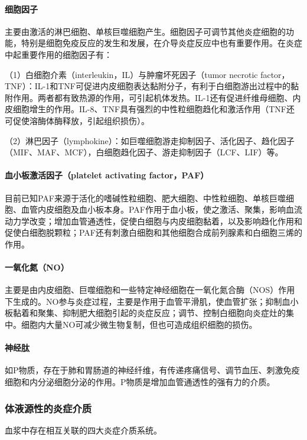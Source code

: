 \paragraph{细胞因子}
主要由激活的淋巴细胞、单核巨噬细胞产生。细胞因子可调节其他炎症细胞的功能，特别是细胞免疫反应的发生和发展，在介导炎症反应中也有重要作用。在炎症中起重要作用的细胞因子有：

（1）白细胞介素（interleukin，IL）与肿瘤坏死因子（tumor necrotic
factor，TNF）：IL-1和TNF可促进内皮细胞表达黏附分子，有利于白细胞游出过程中的黏附作用。两者都有致热源的作用，可引起机体发热。IL-1还有促进纤维母细胞、内皮细胞增生的作用。IL-8、TNF具有强烈的中性粒细胞趋化和激活作用（TNF还可促使溶酶体酶释放，引起组织损伤）。

（2）淋巴因子（lymphokine）：如巨噬细胞游走抑制因子、活化因子、趋化因子（MIF、MAF、MCF），白细胞趋化因子、游走抑制因子（LCF、LIF）等。

\paragraph{血小板激活因子（platelet activating factor，PAF）}
目前已知PAF来源于活化的嗜碱性粒细胞、肥大细胞、中性粒细胞、单核巨噬细胞、血管内皮细胞及血小板本身。PAF作用于血小板，使之激活、聚集，影响血流动力学改变；增加血管通透性，促使白细胞与内皮细胞黏着，以及影响趋化作用和促使白细胞脱颗粒；PAF还有刺激白细胞和其他细胞合成前列腺素和白细胞三烯的作用。

\paragraph{一氧化氮（NO）}
主要是由内皮细胞、巨噬细胞和一些特定神经细胞在一氧化氮合酶（NOS）作用下生成的。NO参与炎症过程，主要是作用于血管平滑肌，使血管扩张；抑制血小板黏着和聚集、抑制肥大细胞引起的炎症反应；调节、控制白细胞向炎症灶的集中。细胞内大量NO可减少微生物复制，但也可造成组织细胞的损伤。

\paragraph{神经肽}
如P物质，存在于肺和胃肠道的神经纤维，有传递疼痛信号、调节血压、刺激免疫细胞和内分泌细胞分泌的作用。P物质是增加血管通透性的强有力的介质。

\subsubsection{体液源性的炎症介质}

血浆中存在相互关联的四大炎症介质系统。


